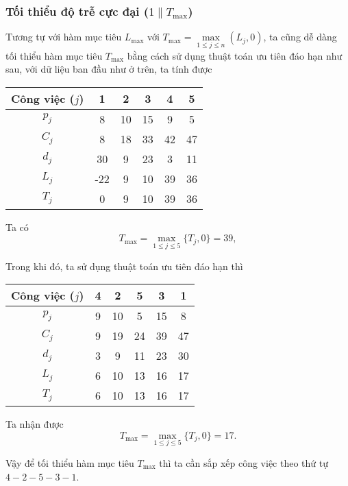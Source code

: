 \documentclass[12pt,a4paper]{report}
\begin{document}
\subsubsection*{Tối thiểu độ trễ cực đại ($1 \| T_{\max}$)}
Tương tự với hàm mục tiêu $L_{\max}$ với $T_{\max}=\underset{1 \leq j \leq n}{\max} (L_j,0)$, ta cũng dễ dàng tối thiểu hàm mục tiêu $T_{\max}$ bằng cách sử dụng thuật toán ưu tiên đáo hạn như sau, với dữ liệu ban đầu như ở trên, ta tính được

\begin{table}[h!]
	\centering
	\begin{tabular}{|c | c c c c c |} 
	\hline
	Công việc ($j$) & 1 & 2 & 3 & 4 & 5 \\
	\hline\hline
	$p_j$ & 8 & 10 & 15 & 9 & 5 \\
	$C_j$ & 8 & 18 & 33 & 42 & 47 \\
	$d_j$ & 30 & 9 & 23 & 3 & 11 \\
	$L_j$ & -22 & 9 & 10 & 39 & 36 \\
	$T_j$ & 0 & 9 & 10 & 39 & 36 \\
	\hline
	\end{tabular}
\end{table}
Ta có
\begin{equation*}
	T_{\max} = \max _{1 \leq j \leq 5} \{T_j, 0\} = 39,
\end{equation*}

Trong khi đó, ta sử dụng thuật toán ưu tiên đáo hạn thì

\begin{table}[h!]
	\centering
	\begin{tabular}{|c | c c c c c |} 
	\hline
	Công việc ($j$) & 4 & 2 & 5 & 3 & 1 \\
	\hline\hline
	$p_j$ & 9 & 10 & 5 & 15 & 8 \\
	$C_j$ & 9 & 19 & 24 & 39 & 47 \\
	$d_j$ & 3 & 9 & 11 & 23 & 30 \\
	$L_j$ & 6 & 10 & 13 & 16 & 17 \\
	$T_j$ & 6 & 10 & 13 & 16 & 17 \\
	\hline
	\end{tabular}
\end{table}

Ta nhận được
\begin{equation*}
	T_{\max} = \max _{1 \leq j \leq 5} \{T_j, 0\} = 17.
\end{equation*}

Vậy để tối thiểu hàm mục tiêu $T_{\max}$ thì ta cần sắp xếp công việc theo thứ tự $4-2-5-3-1$.
\end{document}
